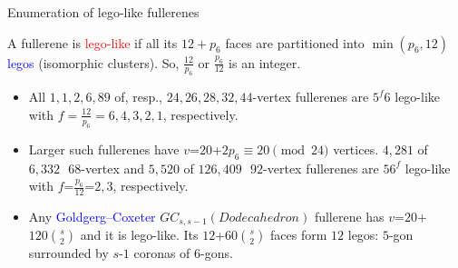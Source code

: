 \documentclass{beamer}
\begin{document}
\begin{frame}{Enumeration of lego-like fullerenes}

A fullerene  is \textcolor{red}{lego-like} 
if
all its $12+p_6$ faces are partitioned into  $\min (p_6,12)$ 
\textcolor{blue}{legos} (isomorphic clusters). So, 
  $\frac{12}{p_6}$  or $\frac{p_6}{12}$ is an integer.

\begin{itemize}

\item All $1,1,2,6,89$ of, resp., $24,26,28,32,44$-vertex fullerenes are $5^f6$ lego-like with  $f=\frac{12}{p_6} 
={6},{4},{3},{2},1$, respectively.

\item Larger such fullerenes have $v$=$20$+$2p_6$$\equiv$$ 20\pmod{24}$ vertices.
$4,281$ of $6,332\,\,$ $68$-vertex and  $5,520$ of $126,409\,\,$ 
 $92$-vertex
fullerenes are $56^f$ lego-like with $f$=$\frac{p_6}{12}$=$2,3$, respectively. 


\item 
Any 
\textcolor{blue}{Goldgerg--Coxeter}  $GC_{s,s-1}(Dodecahedron)$  fullerene
 has 
$v$=$20$+$120 {s\choose 2}$ 
and it is lego-like.  Its $12$+$60 {s\choose 2}$ faces form
 $12$ legos: $5$-gon surrounded by $s$-$1$ coronas of $6$-gons. 


\end{itemize}
\end{frame}
\end{document}
